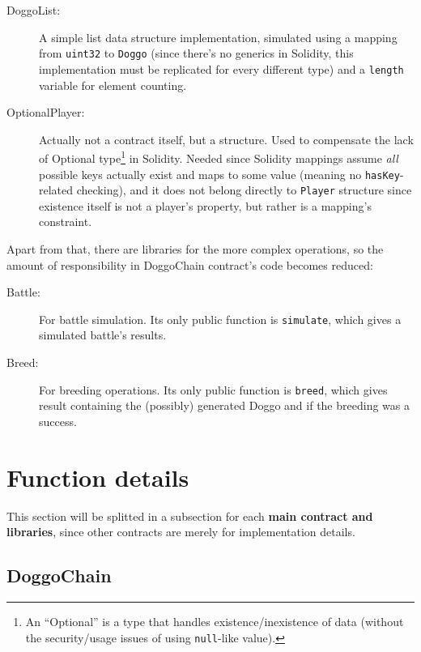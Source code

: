 \documentclass{article}
\begin{document}
    \begin{description}
        \item[DoggoList:] A simple list data structure implementation,
            simulated using a mapping from \texttt{uint32} to \texttt{Doggo}
            (since there's no generics in Solidity, this implementation must be
            replicated for every different type) and a \texttt{length} variable
            for element counting.
        \item[OptionalPlayer:] Actually not a contract itself, but a structure.
            Used to compensate the lack of Optional type\footnote{%
                An ``Optional'' is a type that handles existence/inexistence of
                data (without the security/usage issues of using
                \texttt{null}-like value).
            } in Solidity. Needed since Solidity mappings assume \textit{all}
            possible keys actually exist and maps to some value (meaning no
            \texttt{hasKey}-related checking), and it does not belong directly
            to \texttt{Player} structure since existence itself is not a
            player's property, but rather is a mapping's constraint.
    \end{description}

    Apart from that, there are libraries for the more complex operations, so
    the amount of responsibility in DoggoChain contract's code becomes reduced:

    \begin{description}
        \item[Battle:] For battle simulation. Its only public function is
            \texttt{simulate}, which gives a simulated battle's results.
        \item[Breed:] For breeding operations. Its only public function is
            \texttt{breed}, which gives result containing the (possibly)
            generated Doggo and if the breeding was a success.
    \end{description}


    \section{Function details\label{sec:function-desc}}

    This section will be splitted in a subsection for each \textbf{main
    contract and libraries}, since other contracts are merely for
    implementation details.

    \subsection{DoggoChain}
\end{document}
